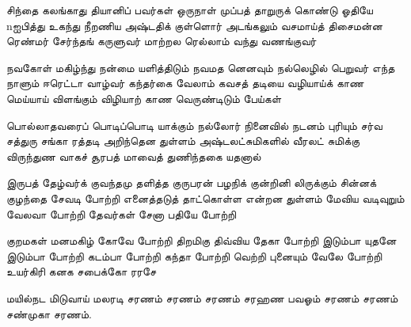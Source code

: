 \begin{flushleft}
{        சிந்தை கலங்காது தியானிப் பவர்கள்
        ஒருநாள் முப்பத் தாறுருக் கொண்டு
        ஓதியே nஐபித்து உகந்து நீறணிய
        அஷ்டதிக் குள்ளொர் அடங்கலும் வசமாய்த்
        திசைமன்ன ரெண்மர் சேர்ந்தங் கருளுவர்
        மாற்றல ரெல்லாம் வந்து வணங்குவர்
                                        
        நவகோள் மகிழ்ந்து நன்மை யளித்திடும்
        நவமத னெனவும் நல்லெழில் பெறுவர்
        எந்த நாளும் ஈரெட்டா வாழ்வர்
        கந்தர்கை வேலாம் கவசத் தடியை
        வழியாய்க் காண மெய்யாய் விளங்கும்
        விழியாற் காண வெருண்டிடும் பேய்கள்
                                        
        பொல்லாதவரைப் பொடிப்பொடி யாக்கும்
        நல்லோர் நினைவில் நடனம் புரியும்
        சர்வ சத்துரு சங்கா ரத்தடி
        அறிந்தென துள்ளம் அஷ்டலட்சுமிகளில்
        வீரலட் சுமிக்கு விருந்துண வாகச்
        சூரபத் மாவைத் துணிந்தகை யதனால்
                                        
        இருபத் தேழ்வர்க் குவந்தமு தளித்த
        குருபரன் பழநிக் குன்றினி லிருக்கும்
        சின்னக் குழந்தை சேவடி போற்றி
        எனைத்தடுத் தாட்கொள்ள என்றன துள்ளம்
        மேவிய வடிவுறும் வேலவா போற்றி
        தேவர்கள் சேனா பதியே போற்றி
                                        
        குறமகள் மனமகிழ் கோவே போற்றி
        திறமிகு திவ்விய தேகா போற்றி
        இடும்பா யுதனே இடும்பா போற்றி
        கடம்பா போற்றி கந்தா போற்றி
        வெற்றி புனையும் வேலே போற்றி
        உயர்கிரி கனக சபைக்கோ ரரசே
                                        
        மயில்நட மிடுவாய் மலரடி சரணம்
        சரணம் சரணம் சரஹண பவஓம்
    சரணம் சரணம் சண்முகா சரணம்.}
\end{flushleft}

